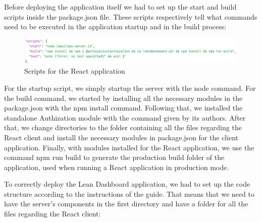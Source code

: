 \documentclass[a4paper,twoside,10pt]{report}
\begin{document}
Before deploying the application itself we had to set up the start and build scripts inside the package.json file. These scripts respectively tell what commands need to be executed in the application startup and in the build process:


\begin{figure}[h!]
\center
  \includegraphics[width=\textwidth]{packageJsonScripts.png}
\caption{Scripts for the React application}
\end{figure}

For the startup script, we simply startup the server with the node command. For the build command, we started by installing all the necessary modules in the package.json with the npm install command. Following that, we installed the standalone Authization module with the command given by its authors.
After that, we change directories to the folder containing all the files regarding the React client and install the necessary modules in package.json for the client application.
Finally, with modules installed for the React application, we use the command npm run build to generate the production build folder of the application, used when running a React application in production mode.

To correctly deploy the Lean Dashboard application, we had to set up the code structure according to the instructions of the guide. That means that we need to have the server's components in the first directory and have a folder for all the files regarding the React client:
\end{document}
